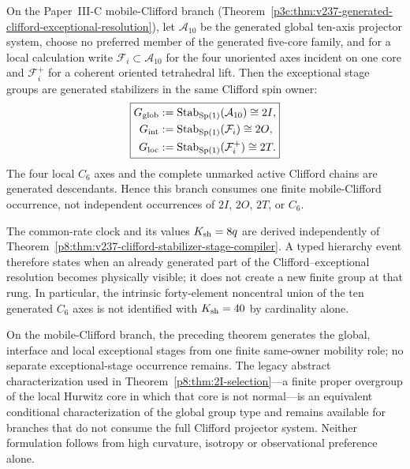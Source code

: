 \documentclass[12pt,a4paper]{article}
\begin{document}
\begin{theorem}
\label{p8:thm:v237-clifford-stabilizer-stage-compiler}
On the Paper~III-C mobile-Clifford branch
(Theorem~\ref{p3c:thm:v237-generated-clifford-exceptional-resolution}), let
\(\mathcal A_{10}\) be the generated global ten-axis projector system, choose
no preferred member of the generated five-core family, and for a local
calculation write \(\mathcal F_i\subset\mathcal A_{10}\) for the four
unoriented axes incident on one core and \(\mathcal F_i^+\) for a coherent
oriented tetrahedral lift.  Then the exceptional stage groups are generated
stabilizers in the same Clifford spin owner:
\[
 \boxed{
 \begin{aligned}
 G_{\rm glob}&:=\operatorname{Stab}_{\operatorname{Sp}(1)}(\mathcal A_{10})\cong2I,\\
 G_{\rm int}&:=\operatorname{Stab}_{\operatorname{Sp}(1)}(\mathcal F_i)\cong2O,\\
 G_{\rm loc}&:=\operatorname{Stab}_{\operatorname{Sp}(1)}(\mathcal F_i^+)\cong2T.
 \end{aligned}}
\]
The four local \(C_6\) axes and the complete unmarked active Clifford chains
are generated descendants.  Hence this branch consumes one finite
mobile-Clifford occurrence, not independent occurrences of \(2I\), \(2O\),
\(2T\), or \(C_6\).
\end{theorem}

\begin{remark}
\label{p8:rem:v237-clock-versus-exceptional-resolution}
The common-rate clock and its values \(K_{\rm sh}=8q\) are derived
independently of Theorem~\ref{p8:thm:v237-clifford-stabilizer-stage-compiler}.
A typed hierarchy event therefore states when an already generated part of the
Clifford--exceptional resolution becomes physically visible; it does not
create a new finite group at that rung.  In particular, the intrinsic
forty-element noncentral union of the ten generated \(C_6\) axes is not
identified with \(K_{\rm sh}=40\) by cardinality alone.
\end{remark}

\begin{remark}
\label{p8:rem:v236-global-stage-conditional}
On the mobile-Clifford branch, the preceding theorem generates the global,
interface and local exceptional stages from one finite same-owner mobility
role; no separate exceptional-stage occurrence remains.  The legacy abstract
characterization used in Theorem~\ref{p8:thm:2I-selection}---a finite proper
overgroup of the local Hurwitz core in which that core is not normal---is an
equivalent conditional characterization of the global group type and remains
available for branches that do not consume the full Clifford projector
system.  Neither formulation follows from high curvature, isotropy or
observational preference alone.
\end{remark}
\end{document}
